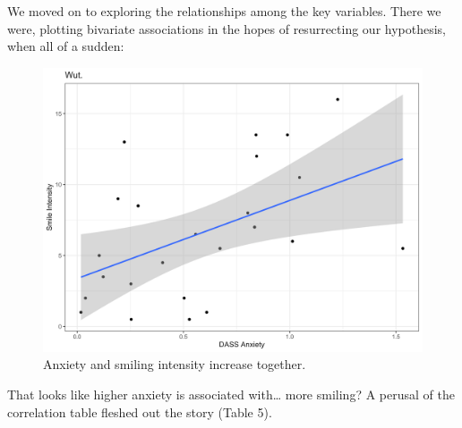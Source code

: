 \documentclass[authordate, empirical]{jote-new-article}
\begin{document}
We moved on to exploring the relationships among the key variables. There we were, plotting bivariate associations in the hopes of resurrecting our hypothesis, when all of a sudden:







\begin{figure}[h!]
  \begin{fullwidth}
    \includegraphics[width=\linewidth]{media/image4.png}

    \caption{Anxiety and smiling intensity increase together.}

  \end{fullwidth}
  \label{fig:rId11}


\end{figure}






That looks like higher anxiety is associated with… more smiling? A perusal of the correlation table fleshed out the story (Table 5).
\end{document}
